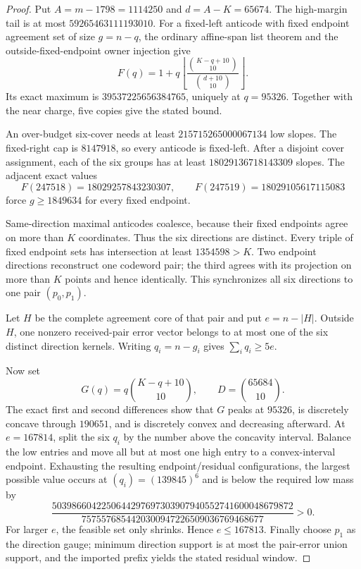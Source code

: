 \begin{proof}
Put \(A=m-1798=1114250\) and \(d=A-K=65674\).  The high-margin tail is at
most \(59265463111193010\).  For a fixed-left anticode with fixed endpoint
agreement set of size \(g=n-q\), the ordinary affine-span list theorem and
the outside-fixed-endpoint owner injection give
\[
 F(q)=1+q\left\lfloor
 \frac{\binom{K-q+10}{10}}{\binom{d+10}{10}}
 \right\rfloor.
\]
Its exact maximum is \(39537225656384765\), uniquely at \(q=95326\).
Together with the near charge, five copies give the stated bound.

An over-budget six-cover needs at least \(215715265000067134\) low slopes.
The fixed-right cap is \(8147918\), so every anticode is fixed-left.  After a
disjoint cover assignment, each of the six groups has at least
\(18029136718143309\) slopes.  The adjacent exact values
\[
 F(247518)=18029257843230307,
 \qquad F(247519)=18029105617115083
\]
force \(g\ge1849634\) for every fixed endpoint.

Same-direction maximal anticodes coalesce, because their fixed endpoints
agree on more than \(K\) coordinates.  Thus the six directions are distinct.
Every triple of fixed endpoint sets has intersection at least
\(1354598>K\).  Two endpoint directions reconstruct one codeword pair; the
third agrees with its projection on more than \(K\) points and hence
identically.  This synchronizes all six directions to one pair \((p_0,p_1)\).

Let \(H\) be the complete agreement core of that pair and put
\(e=n-|H|\).  Outside \(H\), one nonzero received-pair error vector belongs
to at most one of the six distinct direction kernels.  Writing
\(q_i=n-g_i\) gives \(\sum_iq_i\ge5e\).

Now set
\[
 G(q)=q\binom{K-q+10}{10},
 \qquad D=\binom{65684}{10}.
\]
The exact first and second differences show that \(G\) peaks at \(95326\),
is discretely concave through \(190651\), and is discretely convex and
decreasing afterward.  At \(e=167814\), split the six \(q_i\) by the number
above the concavity interval.  Balance the low entries and move all but at
most one high entry to a convex-interval endpoint.  Exhausting the resulting
endpoint/residual configurations, the largest possible value occurs at
\((q_i)=(139845)^6\) and is below the required low mass by
\[
 \frac{
 5039866042250644297697303907940552741600048679872
 }{
 7575576854420300947226509036769468677
 }>0.
\]
For larger \(e\), the feasible set only shrinks.  Hence \(e\le167813\).
Finally choose \(p_1\) as the direction gauge; minimum direction support is
at most the pair-error union support, and the imported prefix yields the
stated residual window.
\end{proof}

